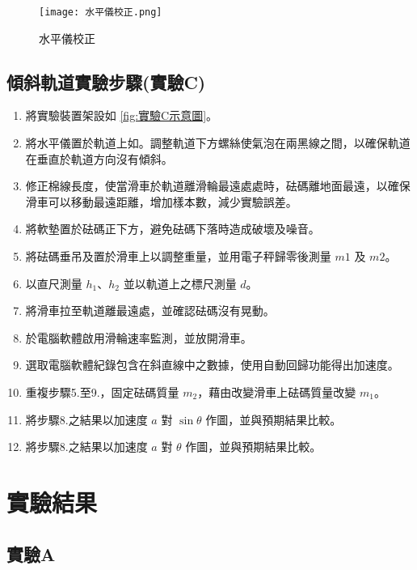 \documentclass[11pt,a4paper]{article}
\theoremstyle{definition}
\begin{document}
            \begin{figure}[H]
                \centering
                \texttt{[image: 水平儀校正.png]}
                \caption{水平儀校正}
                \label{fig:水平儀校正}
            \end{figure}
        
        \subsection{傾斜軌道實驗步驟(實驗C)}

            \begin{enumerate}

                \item 將實驗裝置架設如 \autoref{fig:實驗C示意圖}。
                \item 將水平儀置於軌道上如。調整軌道下方螺絲使氣泡在兩黑線之間，以確保軌道在垂直於軌道方向沒有傾斜。
                \item 修正棉線長度，使當滑車於軌道離滑輪最遠處處時，砝碼離地面最遠，以確保滑車可以移動最遠距離，增加樣本數，減少實驗誤差。
                \item 將軟墊置於砝碼正下方，避免砝碼下落時造成破壞及噪音。
                \item 將砝碼垂吊及置於滑車上以調整重量，並用電子秤歸零後測量 $m1$ 及 $m2$。
                \item 以直尺測量 $h_1、h_2$ 並以軌道上之標尺測量 $d$。
                \item 將滑車拉至軌道離最遠處，並確認砝碼沒有晃動。
                \item 於電腦軟體啟用滑輪速率監測，並放開滑車。
                \item 選取電腦軟體紀錄包含在斜直線中之數據，使用自動回歸功能得出加速度。
                \item 重複步驟5.至9.，固定砝碼質量 $m_2$，藉由改變滑車上砝碼質量改變 $m_1$。 
                \item 將步驟8.之結果以加速度 $a$  對 $\sin{\theta}$ 作圖，並與預期結果比較。
                \item 將步驟8.之結果以加速度 $a$  對 $\theta$ 作圖，並與預期結果比較。

            \end{enumerate} 

    \section{實驗結果}
        \subsection{實驗A}
\end{document}
